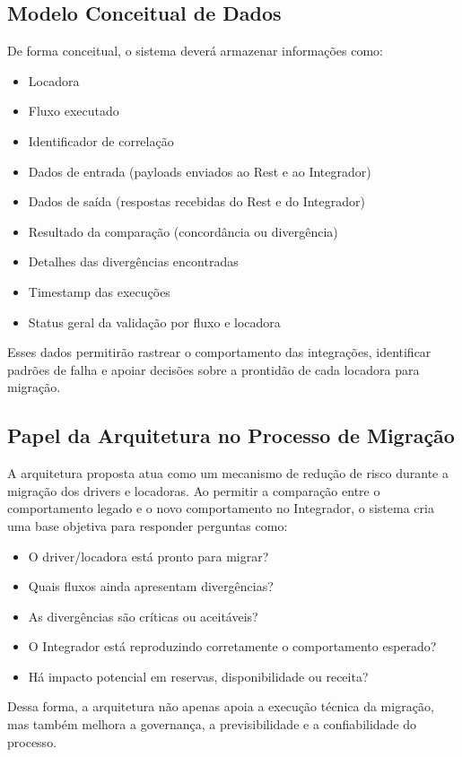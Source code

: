 \subsection{Modelo Conceitual de Dados}

De forma conceitual, o sistema deverá armazenar informações como:
\begin{itemize}
    \item Locadora
    \item Fluxo executado
    \item Identificador de correlação
    \item Dados de entrada (payloads enviados ao Rest e ao Integrador)
    \item Dados de saída (respostas recebidas do Rest e do Integrador)
    \item Resultado da comparação (concordância ou divergência)
    \item Detalhes das divergências encontradas
    \item Timestamp das execuções
    \item Status geral da validação por fluxo e locadora
\end{itemize}

Esses dados permitirão rastrear o comportamento das integrações, identificar padrões de falha e apoiar decisões sobre a prontidão de cada locadora para migração.

\subsection{Papel da Arquitetura no Processo de Migração}

A arquitetura proposta atua como um mecanismo de redução de risco durante a migração dos drivers e locadoras. Ao permitir a comparação entre o comportamento legado e o novo comportamento no Integrador, o sistema cria uma base objetiva para responder perguntas como:
\begin{itemize}
    \item O driver/locadora está pronto para migrar?
    \item Quais fluxos ainda apresentam divergências?
    \item  As divergências são críticas ou aceitáveis?
    \item O Integrador está reproduzindo corretamente o comportamento esperado?
    \item Há impacto potencial em reservas, disponibilidade ou receita?
\end{itemize}

Dessa forma, a arquitetura não apenas apoia a execução técnica da migração, mas também melhora a governança, a previsibilidade e a confiabilidade do processo.

